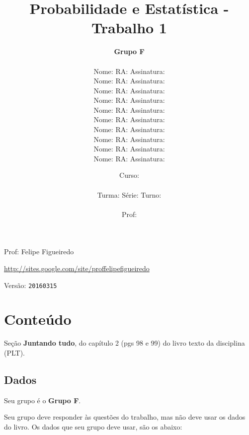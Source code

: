 \documentclass[a4paper]{article}
\date{
\bigskip
Curso: \underline{\hspace{8cm}}\\
\ \\
Turma: \underline{\hspace{1cm}} Série: \underline{\hspace{1cm}} Turno:
\underline{\hspace{1cm}}\\
\ \\
Prof: \underline{\hspace{8cm}}\\
}
\title{Probabilidade e Estatística - Trabalho 1}
\author{
{\bf Grupo F}\\
\ \\
Nome: \underline{\hspace{6cm}} RA: \underline{\hspace{2cm}} Assinatura: \underline{\hspace{4cm}}\\
Nome: \underline{\hspace{6cm}} RA: \underline{\hspace{2cm}} Assinatura: \underline{\hspace{4cm}}\\
Nome: \underline{\hspace{6cm}} RA: \underline{\hspace{2cm}} Assinatura: \underline{\hspace{4cm}}\\
Nome: \underline{\hspace{6cm}} RA: \underline{\hspace{2cm}} Assinatura: \underline{\hspace{4cm}}\\
Nome: \underline{\hspace{6cm}} RA: \underline{\hspace{2cm}} Assinatura: \underline{\hspace{4cm}}\\
Nome: \underline{\hspace{6cm}} RA: \underline{\hspace{2cm}} Assinatura: \underline{\hspace{4cm}}\\
Nome: \underline{\hspace{6cm}} RA: \underline{\hspace{2cm}} Assinatura: \underline{\hspace{4cm}}\\
Nome: \underline{\hspace{6cm}} RA: \underline{\hspace{2cm}} Assinatura: \underline{\hspace{4cm}}\\
Nome: \underline{\hspace{6cm}} RA: \underline{\hspace{2cm}} Assinatura: \underline{\hspace{4cm}}\\
Nome: \underline{\hspace{6cm}} RA: \underline{\hspace{2cm}} Assinatura: \underline{\hspace{4cm}}\\
}
\begin{document}
\maketitle
\newpage

\parbox[c]{.825\textwidth}{\raggedright%
{Prof: Felipe Figueiredo\par}
{\url{http://sites.google.com/site/proffelipefigueiredo}\par}
}

Versão: \verb|20160315|




\section{Conteúdo}

Seção {\bf Juntando tudo}, do capítulo 2 (pgs 98 e 99) do livro texto da disciplina (PLT). 

\subsection{Dados}
Seu grupo é o {\bf Grupo F}.

Seu grupo deve responder às questões do trabalho, mas não deve usar os dados do livro. Os dados que seu grupo deve usar, são os abaixo:
\end{document}
